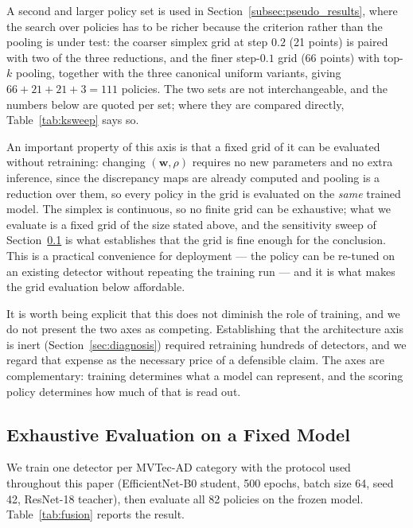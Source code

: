 A second and larger policy set is used in
Section~\ref{subsec:pseudo_results}, where the search over policies has to be
richer because the criterion rather than the pooling is under test: the coarser
simplex grid at step $0.2$ (21 points) is paired with two of the three reductions,
and the finer step-$0.1$ grid (66 points) with top-$k$ pooling, together with the
three canonical uniform variants, giving $66 + 21 + 21 + 3 = 111$ policies. The two sets are not
interchangeable, and the numbers below are quoted per set; where they are compared
directly, Table~\ref{tab:ksweep} says so.

An important property of this axis is that a fixed grid of it can be evaluated
without retraining: changing $(\mathbf{w},\rho)$ requires no new parameters and no
extra inference, since the discrepancy maps are already computed and pooling is a
reduction over them, so every policy in the grid is evaluated on the \emph{same}
trained model. The simplex is continuous, so no finite grid can be exhaustive;
what we evaluate is a fixed grid of the size stated above, and the sensitivity
sweep of Section~\ref{subsec:policy_results} is what establishes that the grid is
fine enough for the conclusion. This is a practical convenience for deployment ---
the policy can be
re-tuned on an existing detector without repeating the training run --- and it is
what makes the grid evaluation below affordable.

It is worth being explicit that this does not diminish the role of training, and
we do not present the two axes as competing. Establishing that the architecture
axis is inert (Section~\ref{sec:diagnosis}) required retraining hundreds of
detectors, and we regard that expense as the necessary price of a defensible
claim. The axes are complementary: training determines what a model can
represent, and the scoring policy determines how much of that is read out.

\subsection{Exhaustive Evaluation on a Fixed Model}
\label{subsec:policy_results}

We train one detector per MVTec-AD category with the protocol used throughout this paper
(EfficientNet-B0 student, 500 epochs, batch size 64, seed 42, ResNet-18 teacher),
then evaluate all 82 policies on the frozen model. Table~\ref{tab:fusion} reports
the result.

